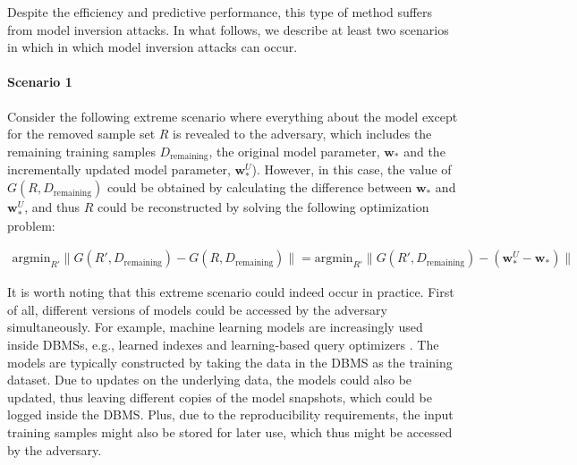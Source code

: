 \documentclass[11pt]{article}
\newcommand{\uw}{\textbf{w}^{U}}
\newcommand{\w}{\textbf{w}}
\begin{document}
Despite the efficiency and predictive performance, this type of method suffers from model inversion attacks. %
In what follows, we describe at least two scenarios in which in which model inversion attacks can occur.

\paragraph{Scenario 1} Consider the following extreme scenario where everything about the model except for the removed sample set $R$ is revealed to the adversary, which includes the remaining training samples $D_{\text{remaining}}$, the original model parameter, $\w_*$ and the incrementally updated model parameter, $\uw_*$). However,  in this case, 
the value of $G(R, D_{\text{remaining}})$ could be obtained by calculating the difference between $\w_*$ and $\uw_*$, and thus $R$ could be reconstructed by solving the following optimization problem:
\begin{small}\label{eq: inversion_attack_1}
\begin{align}
     \text{argmin}_{R'} \|G(R', D_{\text{remaining}}) - G(R, D_{\text{remaining}})\| =  \text{argmin}_{R'}\|G(R', D_{\text{remaining}}) - (\uw_* - \w_*)\|
\end{align}
\end{small}

It is worth noting that this extreme scenario could indeed occur in practice. First of all, different versions of models could be accessed by the adversary simultaneously. For example, 
machine learning models are increasingly used inside DBMSs, 
e.g., learned indexes \cite{kraska2018case} and learning-based query optimizers \cite{marcus12neo}. The models are typically constructed by taking the data in the DBMS as the training dataset. Due to updates on the underlying data, the models could also be updated, thus leaving different copies of the model snapshots, which could be logged inside the DBMS.
Plus, due to the reproducibility requirements, the input training samples might also be stored for later use, which thus might be accessed by the adversary. 
\end{document}
